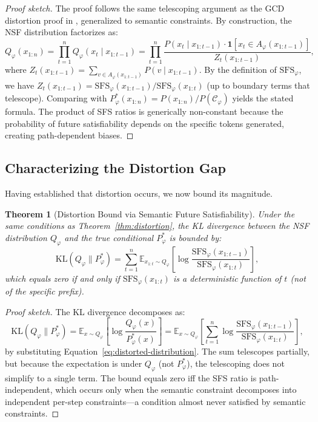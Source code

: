 \documentclass[twoside,11pt]{article}
\newtheorem{theorem}{Theorem}[section]
\newcommand{\Constraint}{\mathcal{C}}
\newcommand{\KL}{\mathrm{KL}}
\newcommand{\E}{\mathbb{E}}
\newcommand{\indicator}{\mathbf{1}}
\newcommand{\SFS}{\mathrm{SFS}}
\begin{document}
\begin{proof}[Proof sketch]
The proof follows the same telescoping argument as the GCD distortion proof
in \citet{ugare2024gad}, generalized to semantic constraints. By
construction, the NSF distribution factorizes as:
\[
Q_\varphi(x_{1:n}) = \prod_{t=1}^{n} Q_\varphi(x_t \mid x_{1:t-1})
= \prod_{t=1}^{n} \frac{P(x_t \mid x_{1:t-1}) \cdot \indicator[x_t
\in A_\varphi(x_{1:t-1})]}{Z_t(x_{1:t-1})},
\]
where $Z_t(x_{1:t-1}) = \sum_{v \in A_\varphi(x_{1:t-1})} P(v \mid
x_{1:t-1})$. By the definition of $\SFS_\varphi$, we have $Z_t(x_{1:t-1})
= \SFS_\varphi(x_{1:t-1}) / \SFS_\varphi(x_{1:t})$ (up to boundary terms
that telescope). Comparing with $P^*_\varphi(x_{1:n}) = P(x_{1:n}) /
P(\Constraint_\varphi)$ yields the stated formula. The product of SFS ratios
is generically non-constant because the probability of future satisfiability
depends on the specific tokens generated, creating path-dependent biases.
\end{proof}

\subsection{Characterizing the Distortion Gap}
\label{sec:distortion-gap}

Having established that distortion occurs, we now bound its magnitude.

\begin{theorem}[Distortion Bound via Semantic Future Satisfiability]
\label{thm:distortion-bound}
Under the same conditions as Theorem~\ref{thm:distortion}, the KL
divergence between the NSF distribution $Q_\varphi$ and the true conditional
$P^*_\varphi$ is bounded by:
\begin{equation}
\label{eq:kl-bound}
\KL(Q_\varphi \| P^*_\varphi) = \sum_{t=1}^{n}
\E_{x_{1:t} \sim Q_\varphi}\!\left[\log
\frac{\SFS_\varphi(x_{1:t-1})}{\SFS_\varphi(x_{1:t})} \right],
\end{equation}
which equals zero if and only if $\SFS_\varphi(x_{1:t})$ is a deterministic
function of $t$ (not of the specific prefix).
\end{theorem}

\begin{proof}[Proof sketch]
The KL divergence decomposes as:
\[
\KL(Q_\varphi \| P^*_\varphi) = \E_{x \sim Q_\varphi}\!\left[\log
\frac{Q_\varphi(x)}{P^*_\varphi(x)}\right]
= \E_{x \sim Q_\varphi}\!\left[\sum_{t=1}^{n} \log
\frac{\SFS_\varphi(x_{1:t-1})}{\SFS_\varphi(x_{1:t})}\right],
\]
by substituting Equation~\ref{eq:distorted-distribution}. The sum
telescopes partially, but because the expectation is under $Q_\varphi$
(not $P^*_\varphi$), the telescoping does not simplify to a single
term. The bound equals zero iff the SFS ratio is path-independent, which
occurs only when the semantic constraint decomposes into independent per-step
constraints---a condition almost never satisfied by semantic constraints.
\end{proof}
\end{document}
